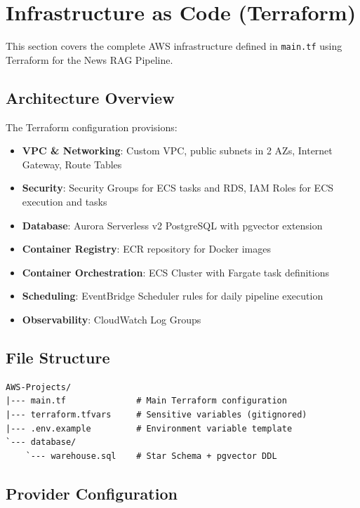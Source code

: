 \hypertarget{infrastructure-as-code-terraform}{%
\section{Infrastructure as Code
(Terraform)}}

This section covers the complete AWS infrastructure defined in
\texttt{main.tf} using Terraform for the News RAG Pipeline.

\hypertarget{architecture-overview}{%
\subsection{Architecture Overview}}

The Terraform configuration provisions:

\begin{itemize}
\tightlist
\item
  \textbf{VPC \& Networking}: Custom VPC, public subnets in 2 AZs,
  Internet Gateway, Route Tables
\item
  \textbf{Security}: Security Groups for ECS tasks and RDS, IAM Roles
  for ECS execution and tasks
\item
  \textbf{Database}: Aurora Serverless v2 PostgreSQL with pgvector
  extension
\item
  \textbf{Container Registry}: ECR repository for Docker images
\item
  \textbf{Container Orchestration}: ECS Cluster with Fargate task
  definitions
\item
  \textbf{Scheduling}: EventBridge Scheduler rules for daily pipeline
  execution
\item
  \textbf{Observability}: CloudWatch Log Groups
\end{itemize}

\hypertarget{file-structure}{%
\subsection{File Structure}}

\begin{verbatim}
AWS-Projects/
|--- main.tf              # Main Terraform configuration
|--- terraform.tfvars     # Sensitive variables (gitignored)
|--- .env.example         # Environment variable template
`--- database/
    `--- warehouse.sql    # Star Schema + pgvector DDL
\end{verbatim}

\hypertarget{provider-configuration}{%
\subsection{Provider Configuration}}

